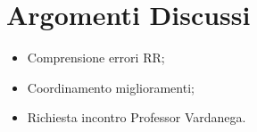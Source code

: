 \section{Argomenti Discussi}
	\begin{itemize}
		\item Comprensione errori RR;
		\item Coordinamento miglioramenti;
		\item Richiesta incontro Professor Vardanega.
	\end{itemize}